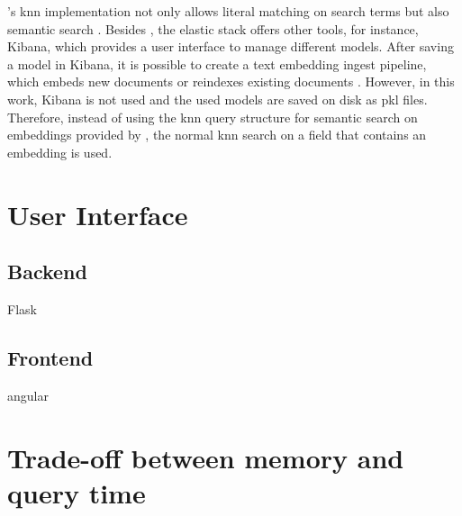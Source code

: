\databaseName{}'s \ac{knn} implementation not only allows literal matching on search terms but also semantic search \cite{Elasticsearch-knn}.
Besides \databaseName{}, the elastic stack offers other tools, for instance, Kibana, which provides a user interface to manage different models.
After saving a model in Kibana, it is possible to create a text embedding ingest pipeline, which embeds new documents or reindexes existing documents \cite{Elasticsearch-knn-embedding}.
However, in this work, Kibana is not used and the used models are saved on disk as \ac{pkl} files.
Therefore, instead of using the \ac{knn} query structure for semantic search on embeddings provided by \databaseName{}, the normal \ac{knn} search on a field that contains an embedding is used.


\section{User Interface}\label{sec:ui}

\subsection{Backend}\label{subsec:backend}
Flask

\subsection{Frontend}\label{subsec:frontend}
angular

\section{Trade-off between memory and query time}\label{sec:trade-off}